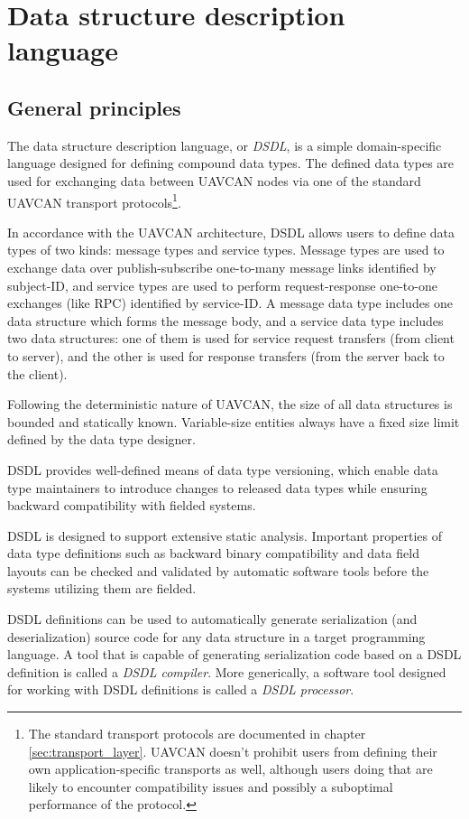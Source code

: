 \chapter{Data structure description language}\label{sec:dsdl}

\section{General principles}

The data structure description language, or \emph{DSDL}, is a simple domain-specific language designed for
defining compound data types.
The defined data types are used for exchanging data between UAVCAN nodes via one of the standard UAVCAN
transport protocols\footnote{The standard transport protocols are documented in chapter \ref{sec:transport_layer}.
UAVCAN doesn't prohibit users from defining their own application-specific transports as well,
although users doing that are likely to encounter compatibility issues and possibly a suboptimal
performance of the protocol.}.

In accordance with the UAVCAN architecture, DSDL allows users to define data types of two kinds:
message types and service types.
Message types are used to exchange data over publish-subscribe one-to-many message links identified by subject-ID,
and service types are used to perform request-response one-to-one exchanges (like RPC) identified by service-ID.
A message data type includes one data structure which forms the message body,
and a service data type includes two data structures: one of them is used for service request transfers
(from client to server), and the other is used for response transfers (from the server back to the client).

Following the deterministic nature of UAVCAN, the size of all data structures is bounded and statically known.
Variable-size entities always have a fixed size limit defined by the data type designer.

DSDL provides well-defined means of data type versioning, which enable data type maintainers to introduce changes
to released data types while ensuring backward compatibility with fielded systems.

DSDL is designed to support extensive static analysis. Important properties of data type definitions such as
backward binary compatibility and data field layouts can be checked and validated by automatic software tools
before the systems utilizing them are fielded.

DSDL definitions can be used to automatically generate serialization (and deserialization) source code
for any data structure in a target programming language.
A tool that is capable of generating serialization code based on a DSDL definition is called a \emph{DSDL compiler}.
More generically, a software tool designed for working with DSDL definitions is called a \emph{DSDL processor}.






